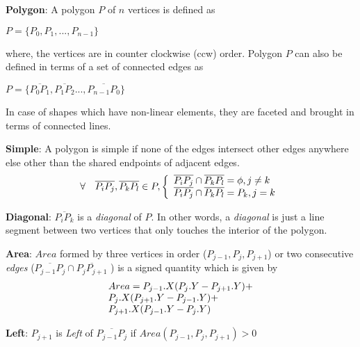 \begin{list}{}{}
\item {\bf Polygon}: A polygon $P$ of $n$ vertices is defined as 

$P = \{P_0,P_1,...,P_{n-1}\}$

where, the vertices are in counter clockwise (ccw) order. Polygon $P$ can also be defined in terms of a set of connected edges as  

$P = \{\overline{P_0 P_1},\overline{P_1 P_2}...,\overline{P_{n-1} P_0}\}$

In case of shapes which have non-linear elements, they are faceted and brought in terms of connected lines.

\item {\bf Simple}: A polygon is simple if none of the edges intersect other edges anywhere else other than the shared endpoints of adjacent edges.
\begin{displaymath}
\forall \quad \overline{P_i P_j}, \overline{P_k P_l} \in P, \left\{ 
  \begin{array}{l l}
     \overline{P_i P_j} \cap \overline{P_k P_l} = \phi , j \neq k\\
     \overline{P_i P_j} \cap \overline{P_k P_l} = P_k  , j = k
  \end{array} \right.
\end{displaymath}

\item {\bf Diagonal}: $\overline{P_i P_k}$ is a {\em diagonal} of $P$.  In other words, a {\em diagonal} is just a line segment between two vertices that only touches the interior of the polygon.

\item {\bf Area}: $Area$ formed by three vertices in order ($ P_{j-1}, P_j,  P_{j+1}$) or two consecutive {\em edges} ($ \overline{P_{j-1} P_j} \cap \overline{P_j P_{j+1}}$ ) is a signed quantity which is given by
\begin{displaymath}
\begin{array}{l l}
Area = P_{j-1}.X ( P_j.Y - P_{j+1}.Y) + \\
P_j.X (P_{j+1}.Y -  P_{j-1}.Y) + \\
P_{j+1}.X ( P_{j-1}.Y - P_j.Y) 
 \end{array} 
\end{displaymath}

\item {\bf Left}: $P_{j+1}$ is {\em Left} of $ \overline{P_{j-1} P_j}$ if $Area( P_{j-1}, P_j,  P_{j+1}) > 0$ 


\end{list}
